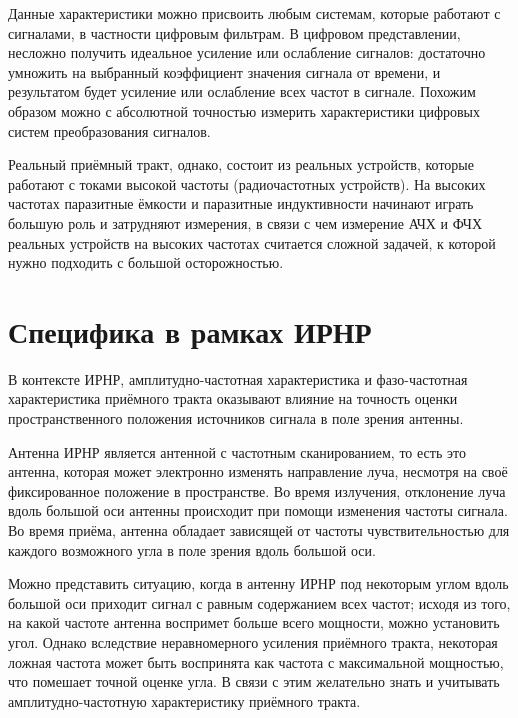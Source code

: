 \documentclass{report}
\begin{document}

Данные характеристики можно присвоить любым системам, которые работают с сигналами, в частности цифровым фильтрам. В цифровом представлении, несложно получить идеальное усиление или ослабление сигналов: достаточно умножить на выбранный коэффициент значения сигнала от времени, и результатом будет усиление или ослабление всех частот в сигнале. Похожим образом можно с абсолютной точностью измерить характеристики цифровых систем преобразования сигналов.

Реальный приёмный тракт, однако, состоит из реальных устройств, которые работают с токами высокой частоты (радиочастотных устройств). На высоких частотах паразитные ёмкости и паразитные индуктивности начинают играть большую роль и затрудняют измерения, в связи с чем измерение АЧХ и ФЧХ реальных устройств на высоких частотах считается сложной задачей, к которой нужно подходить с большой осторожностью.


\section{Специфика в рамках ИРНР}

В контексте ИРНР, амплитудно-частотная характеристика и фазо-частотная характеристика приёмного тракта оказывают влияние на точность оценки пространственного положения источников сигнала в поле зрения антенны.

Антенна ИРНР является антенной с частотным сканированием, то есть это антенна, которая может электронно изменять направление луча, несмотря на своё фиксированное положение в пространстве. Во время излучения, отклонение луча вдоль большой оси антенны происходит при помощи изменения частоты сигнала. Во время приёма, антенна обладает зависящей от частоты чувствительностью для каждого возможного угла в поле зрения вдоль большой оси.

Можно представить ситуацию, когда в антенну ИРНР под некоторым углом вдоль большой оси приходит сигнал с равным содержанием всех частот; исходя из того, на какой частоте антенна воспримет больше всего мощности, можно установить угол. Однако вследствие неравномерного усиления приёмного тракта, некоторая ложная частота может быть воспринята как частота с максимальной мощностью, что помешает точной оценке угла. В связи с этим желательно знать и учитывать амплитудно-частотную характеристику приёмного тракта.
\end{document}
